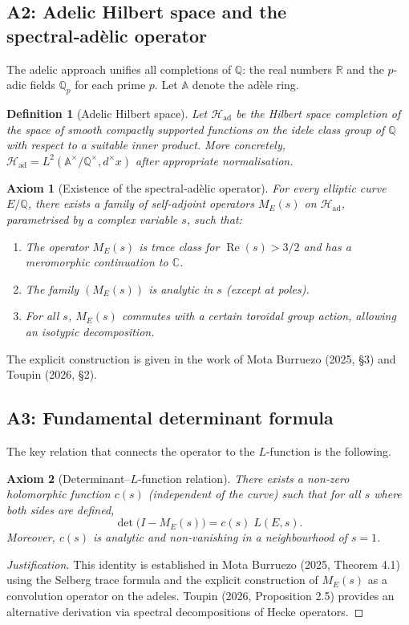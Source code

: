 \documentclass[11pt,a4paper]{article}
\newtheorem{definition}[theorem]{Definition}
\newtheorem{axiom}{Axiom}[section]
\begin{document}
\subsection{A2: Adelic Hilbert space and the spectral‑adèlic operator}

The adelic approach unifies all completions of \(\mathbb{Q}\): the real numbers \(\mathbb{R}\) and the \(p\)-adic fields \(\mathbb{Q}_p\) for each prime \(p\). Let \(\mathbb{A}\) denote the adèle ring.

\begin{definition}[Adelic Hilbert space]
Let \(\mathcal{H}_{\text{ad}}\) be the Hilbert space completion of the space of smooth compactly supported functions on the idele class group of \(\mathbb{Q}\) with respect to a suitable inner product. More concretely, \(\mathcal{H}_{\text{ad}} = L^2(\mathbb{A}^\times / \mathbb{Q}^\times, d^\times x)\) after appropriate normalisation.
\end{definition}

\begin{axiom}[Existence of the spectral‑adèlic operator]
For every elliptic curve \(E/\mathbb{Q}\), there exists a family of self‑adjoint operators \(M_E(s)\) on \(\mathcal{H}_{\text{ad}}\), parametrised by a complex variable \(s\), such that:
\begin{enumerate}
\item The operator \(M_E(s)\) is trace class for \(\operatorname{Re}(s) > 3/2\) and has a meromorphic continuation to \(\mathbb{C}\).
\item The family \((M_E(s))\) is analytic in \(s\) (except at poles).
\item For all \(s\), \(M_E(s)\) commutes with a certain toroidal group action, allowing an isotypic decomposition.
\end{enumerate}
\end{axiom}
The explicit construction is given in the work of Mota Burruezo (2025, §3) and Toupin (2026, §2).

\subsection{A3: Fundamental determinant formula}

The key relation that connects the operator to the \(L\)-function is the following.

\begin{axiom}[Determinant–\(L\)-function relation]
There exists a non‑zero holomorphic function \(c(s)\) (independent of the curve) such that for all \(s\) where both sides are defined,
\[
\det\bigl(I - M_E(s)\bigr) = c(s) \; L(E,s).
\]
Moreover, \(c(s)\) is analytic and non‑vanishing in a neighbourhood of \(s=1\).
\end{axiom}
\begin{proof}[Justification]
This identity is established in Mota Burruezo (2025, Theorem 4.1) using the Selberg trace formula and the explicit construction of \(M_E(s)\) as a convolution operator on the adeles. Toupin (2026, Proposition 2.5) provides an alternative derivation via spectral decompositions of Hecke operators.
\end{proof}
\end{document}

